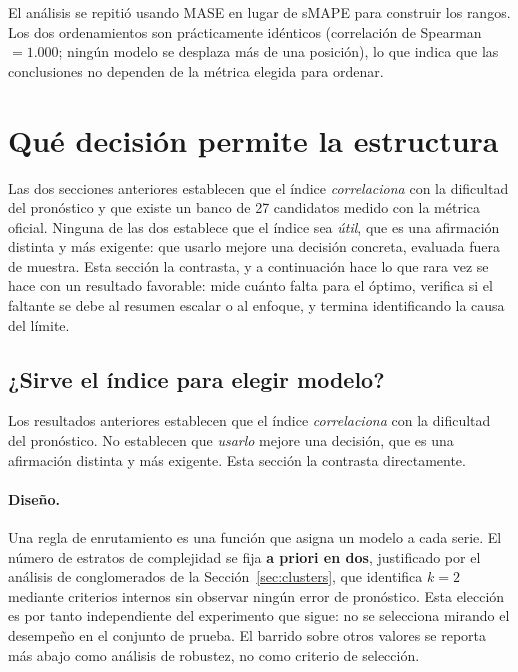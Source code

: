 El análisis se repitió usando MASE en lugar de sMAPE para construir los rangos. Los
dos ordenamientos son prácticamente idénticos (correlación de Spearman $=1.000$;
ningún modelo se desplaza más de una posición), lo que indica que las conclusiones
no dependen de la métrica elegida para ordenar.

\section{Qué decisión permite la estructura}\label{sec:decision}

Las dos secciones anteriores establecen que el índice \emph{correlaciona} con la
dificultad del pronóstico y que existe un banco de 27 candidatos medido con la métrica
oficial. Ninguna de las dos establece que el índice sea \emph{útil}, que es una
afirmación distinta y más exigente: que usarlo mejore una decisión concreta, evaluada
fuera de muestra. Esta sección la contrasta, y a continuación hace lo que rara vez se
hace con un resultado favorable: mide cuánto falta para el óptimo, verifica si el
faltante se debe al resumen escalar o al enfoque, y termina identificando la causa del
límite.

\subsection{¿Sirve el índice para elegir modelo?}\label{sec:enrutamiento}

Los resultados anteriores establecen que el índice \emph{correlaciona} con la
dificultad del pronóstico. No establecen que \emph{usarlo} mejore una decisión, que
es una afirmación distinta y más exigente. Esta sección la contrasta directamente.

\paragraph{Diseño.} Una regla de enrutamiento es una función que asigna un modelo a
cada serie. El número de estratos de complejidad se fija \textbf{a priori en dos},
justificado por el análisis de conglomerados de la Sección~\ref{sec:clusters}, que identifica $k=2$
mediante criterios internos sin observar ningún error de pronóstico. Esta elección es
por tanto independiente del experimento que sigue: no se selecciona mirando el
desempeño en el conjunto de prueba. El barrido sobre otros valores se reporta más
abajo como análisis de robustez, no como criterio de selección.

